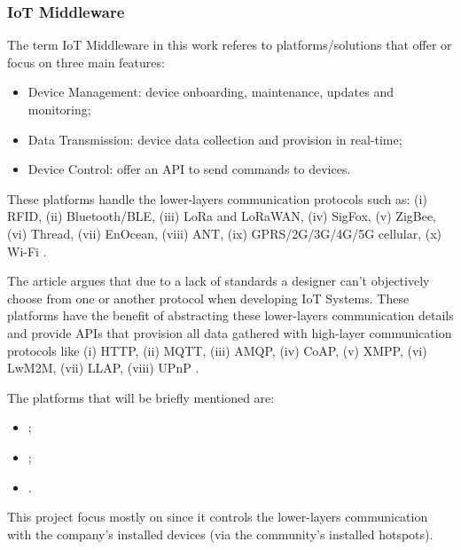 \subsubsection{IoT Middleware}
\label{subsubsec:stateofart:arch:infra:middleware}

The term \gls{IoT} Middleware in this work referes to platforms/solutions that offer or focus on three main features:

\begin{itemize}
    \item Device Management: device onboarding, maintenance, updates and monitoring;
    \item Data Transmission: device data collection and provision in real-time;
    \item Device Control: offer an \gls{API} to send commands to devices. 
\end{itemize}

These platforms handle the lower-layers communication protocols such as: (i) RFID, (ii) Bluetooth/BLE, (iii) LoRa and LoRaWAN, (iv) SigFox, (v) ZigBee, (vi) Thread, (vii) EnOcean, (viii) ANT, (ix) GPRS/2G/3G/4G/5G cellular, (x) Wi-Fi \parencite{DIAS2022100529}.

The article  argues that due to a lack of standards a designer can't objectively choose from one or another protocol when developing \gls{IoT} Systems. These platforms have the benefit of abstracting these lower-layers communication details and provide \gls{API}s that provision all data gathered with high-layer communication protocols like (i) HTTP, (ii) \gls{MQTT}, (iii) \gls{AMQP}, (iv) CoAP, (v) XMPP, (vi) LwM2M, (vii) LLAP, (viii) UPnP \parencite{DIAS2022100529}.

The platforms that will be briefly mentioned are:

\begin{itemize}
    \item {};
    \item {};
    \item {}.
\end{itemize}

This project focus mostly on  since it controls the lower-layers communication with the company's installed devices (via the community's installed hotspots).

